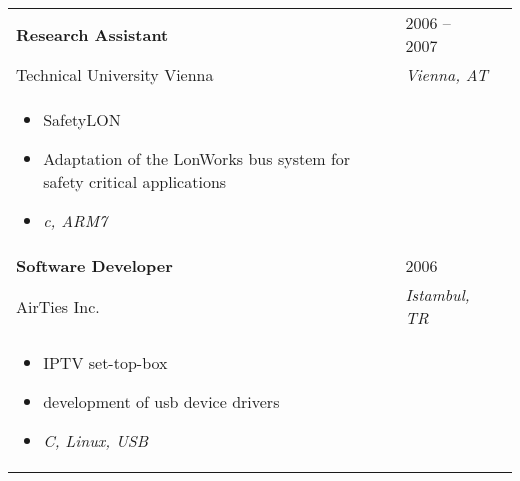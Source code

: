 \documentclass[letterpaper,11pt]{article}
\newcommand{\resumeItem}{
  \item{
    {\vspace{-2pt}}
  }
}
\newcommand{\resumeSubItem}{\resumeItem \vspace{-4pt} \small}
\begin{document}
\begin{longtable}{L{0.70\textwidth} R{0.25\textwidth} R{0.05\textwidth}}
\textbf{Research Assistant} & 2006 -- 2007\\
Technical University Vienna & \textit{Vienna, AT}\\
\begin{itemize}
	 \resumeItem SafetyLON
     \resumeSubItem Adaptation of the LonWorks bus system for safety critical applications
	 \resumeSubItem \textit{c, ARM7}
 \end{itemize} & \\

\textbf{Software Developer} & 2006\\
AirTies Inc. & \textit{Istambul, TR} \\
\begin{itemize}
	 \resumeItem IPTV set-top-box
     \resumeSubItem development of usb device drivers
     \resumeSubItem \textit{C, Linux, USB}
 \end{itemize} & \\

\end{longtable}




\begin{center}
\vspace{\fill} \
\end{center}
\end{document}

